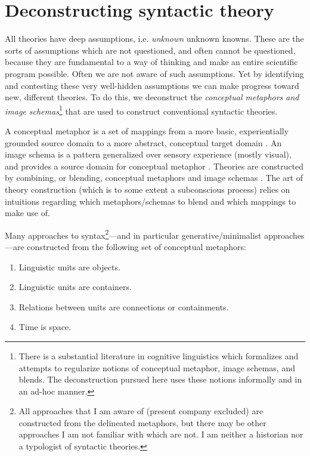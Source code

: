 \chapter{Deconstructing syntactic theory}

All theories have deep assumptions, i.e. \textit{unknown} unknown knowns. These are the sorts of assumptions which are not questioned, and often cannot be questioned, because they are fundamental to a way of thinking and make an entire scientific program possible. Often we are not aware of such assumptions. Yet by identifying and contesting these very well-hidden assumptions we can make progress toward new, different theories. To do this, we deconstruct the \textit{conceptual metaphors and image schemas}\footnote{There is a substantial literature in cognitive linguistics which formalizes and attempts to regularize notions of conceptual metaphor, image schemas, and blends. The deconstruction pursued here uses these notions informally and in an ad-hoc manner.} that are used to construct conventional syntactic theories. 

  A conceptual metaphor is a set of mappings from a more basic, experientially grounded source domain to a more abstract, conceptual target domain \citep{Lakoff1990,Lakoff1993,Lakoff2008,LakoffJohnson1980a,LakoffJohnson1980b,LakoffJohnson1999,LakoffJohnson2000}. An image schema is a pattern generalized over sensory experience (mostly visual), and provides a source domain for conceptual metaphor \citep{ClausnerCroft1999,FauconnierTurner1996,FauconnierTurner2008,GibbsColston1995,GradyEtAl1999,Langacker2002,Oakley2007,Talmy1983,Talmy1988}. Theories are constructed by combining, or blending, conceptual metaphors and image schemas \citep{FauconnierTurner1996,FauconnierTurner2008,GradyEtAl1999,LakoffNúñez2000}. The art of theory construction (which is to some extent a subconscious process) relies on intuitions regarding which metaphors/schemas to blend and which mappings to make use of.

  Many approaches to syntax\footnote{All approaches that I am aware of (present company excluded) are constructed from the delineated metaphors, but there may be other approaches I am not familiar with which are not. I am neither a historian nor a typologist of syntactic theories.}—and in particular generative/minimalist approaches—are constructed from the following set of conceptual metaphors: 

\begin{enumerate}
\item Linguistic units are objects.
\item Linguistic units are containers.
\item Relations between units are connections or containments.
\item Time is space.
\end{enumerate}

